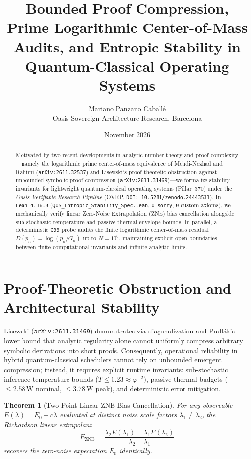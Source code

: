 \documentclass[11pt,a4paper]{article}
\title{Bounded Proof Compression, Prime Logarithmic Center-of-Mass Audits, and Entropic Stability in Quantum-Classical Operating Systems}
\author{Mariano Panzano Caball\'e \\ \small Oasis Sovereign Architecture Research, Barcelona}
\date{November 2026}
\newtheorem{theorem}{Theorem}
\begin{document}
\maketitle

\begin{abstract}
Motivated by two recent developments in analytic number theory and proof complexity---namely the logarithmic prime center-of-mass equivalence of Mehdi-Nezhad and Rahimi (\texttt{arXiv:2611.32537}) and Lisewski's proof-theoretic obstruction against unbounded symbolic proof compression (\texttt{arXiv:2611.31469})---we formalize stability invariants for lightweight quantum-classical operating systems (Pillar~370) under the \emph{Oasis Verifiable Research Pipeline} (OVRP, \texttt{DOI: 10.5281/zenodo.24443531}). In \texttt{Lean~4.36.0} (\texttt{QOS\_Entropic\_Stability\_Spec.lean}, \texttt{0 sorry}, \texttt{0} custom axioms), we mechanically verify linear Zero-Noise Extrapolation (ZNE) bias cancellation alongside sub-stochastic temperature and passive thermal-envelope bounds. In parallel, a deterministic \texttt{C99} probe audits the finite logarithmic center-of-mass residual $D(p_n) = \log(p_n / G_n)$ up to $N = 10^6$, maintaining explicit open boundaries between finite computational invariants and infinite analytic limits.
\end{abstract}

\section{Proof-Theoretic Obstruction and Architectural Stability}
Lisewski (\texttt{arXiv:2611.31469}) demonstrates via diagonalization and Pudl\'ak's lower bound that analytic regularity alone cannot uniformly compress arbitrary symbolic derivations into short proofs. Consequently, operational reliability in hybrid quantum-classical schedulers cannot rely on unbounded emergent compression; instead, it requires explicit runtime invariants: sub-stochastic inference temperature bounds ($T \le 0.23 \approx \varphi^{-2}$), passive thermal budgets ($\le 2.58\,\mathrm{W}$ nominal, $\le 3.78\,\mathrm{W}$ peak), and deterministic error mitigation.

\begin{theorem}[Two-Point Linear ZNE Bias Cancellation]
For any observable $E(\lambda) = E_0 + c\lambda$ evaluated at distinct noise scale factors $\lambda_1 \neq \lambda_2$, the Richardson linear extrapolant
\[
E_{\mathrm{ZNE}} = \frac{\lambda_2 E(\lambda_1) - \lambda_1 E(\lambda_2)}{\lambda_2 - \lambda_1}
\]
recovers the zero-noise expectation $E_0$ identically.
\end{theorem}
\end{document}
